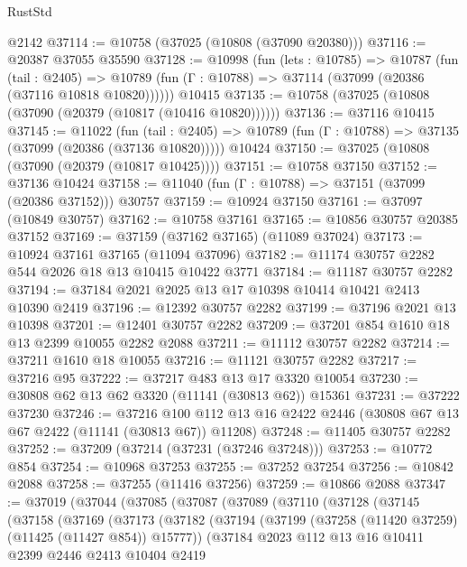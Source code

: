\begin{lexlean}{RustStd}
\begin{coremodule}
    @2142
@37114 := @10758 (@37025 (@10808 (@37090 @20380)))
@37116 := @20387 @37055 @35590
@37128 := @10998
    (fun (lets : @10785) =>
    @10787
      (fun (tail : @2405) =>
      @10789 (fun (Γ : @10788) => @37114 (@37099 (@20386 (@37116 @10818 @10820))))))
    @10415
@37135 := @10758 (@37025 (@10808 (@37090 (@20379 (@10817 (@10416 @10820))))))
@37136 := @37116 @10415
@37145 := @11022
    (fun (tail : @2405) => @10789 (fun (Γ : @10788) => @37135 (@37099 (@20386 (@37136 @10820)))))
    @10424
@37150 := @37025 (@10808 (@37090 (@20379 (@10817 @10425))))
@37151 := @10758 @37150
@37152 := @37136 @10424
@37158 := @11040 (fun (Γ : @10788) => @37151 (@37099 (@20386 @37152))) @30757
@37159 := @10924 @37150
@37161 := @37097 (@10849 @30757)
@37162 := @10758 @37161
@37165 := @10856 @30757 @20385 @37152
@37169 := @37159 (@37162 @37165) (@11089 @37024)
@37173 := @10924 @37161 @37165 (@11094 @37096)
@37182 := @11174 @30757 @2282 @544 @2026 @18 @13 @10415 @10422 @3771
@37184 := @11187 @30757 @2282
@37194 := @37184 @2021 @2025 @13 @17 @10398 @10414 @10421 @2413 @10390 @2419
@37196 := @12392 @30757 @2282
@37199 := @37196 @2021 @13 @10398
@37201 := @12401 @30757 @2282
@37209 := @37201 @854 @1610 @18 @13 @2399 @10055 @2282 @2088
@37211 := @11112 @30757 @2282
@37214 := @37211 @1610 @18 @10055
@37216 := @11121 @30757 @2282
@37217 := @37216 @95
@37222 := @37217 @483 @13 @17 @3320 @10054
@37230 := @30808 @62 @13 @62 @3320 (@11141 (@30813 @62)) @15361
@37231 := @37222 @37230
@37246 := @37216
    @100
    @112
    @13
    @16
    @2422
    @2446
    (@30808 @67 @13 @67 @2422 (@11141 (@30813 @67)) @11208)
@37248 := @11405 @30757 @2282
@37252 := @37209 (@37214 (@37231 (@37246 @37248)))
@37253 := @10772 @854
@37254 := @10968 @37253
@37255 := @37252 @37254
@37256 := @10842 @2088
@37258 := @37255 (@11416 @37256)
@37259 := @10866 @2088
@37347 := @37019
    (@37044
      (@37085
        (@37087
          (@37089
            (@37110
              (@37128
                (@37145
                  (@37158
                    (@37169
                      (@37173
                        (@37182
                          (@37194
                            (@37199 (@37258 (@11420 @37259) (@11425 (@11427 @854)) @15777))
                            (@37184
                              @2023
                              @112
                              @13
                              @16
                              @10411
                              @2399
                              @2446
                              @2413
                              @10404
                              @2419

\end{coremodule}
\end{lexlean}
